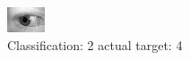 \begin{figure}[h!]
\begin{center}
\includegraphics[width=0.60\columnwidth]{figures/ID846_class_2_target_4.png}
\end{center}
\caption{ Classification: 2 actual target: 4}
\label{fig:ID846_class_2_target_4}
\end{figure}
